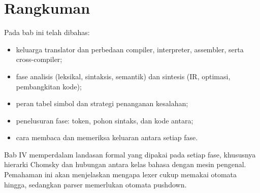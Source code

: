 \section*{Rangkuman}

Pada bab ini telah dibahas:
\begin{itemize}[leftmargin=*]
  \item keluarga translator dan perbedaan compiler, interpreter,
        assembler, serta cross-compiler;
  \item fase analisis (leksikal, sintaksis, semantik) dan sintesis
        (IR, optimasi, pembangkitan kode);
  \item peran tabel simbol dan strategi penanganan kesalahan;
  \item penelusuran fase: token, pohon sintaks, dan kode antara;
  \item cara membaca dan memeriksa keluaran antara setiap fase.
\end{itemize}

Bab IV memperdalam landasan formal yang dipakai pada setiap fase,
khususnya hierarki Chomsky dan hubungan antara kelas bahasa dengan
mesin pengenal. Pemahaman ini akan menjelaskan mengapa lexer cukup
memakai otomata hingga, sedangkan parser memerlukan otomata pushdown.
